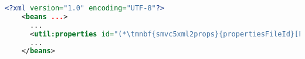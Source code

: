 \begin{lstlisting}[language=XML, title={Spring XML configuration}]
    <?xml version="1.0" encoding="UTF-8"?>
    <beans ...>
      ...
      <util:properties id="(*\tmnbf{smvc5xml2props}{propertiesFileId}[ForestGreen]*)" location="WEB-INF/fileName.properties"/>
      ...
    </beans>
\end{lstlisting}
